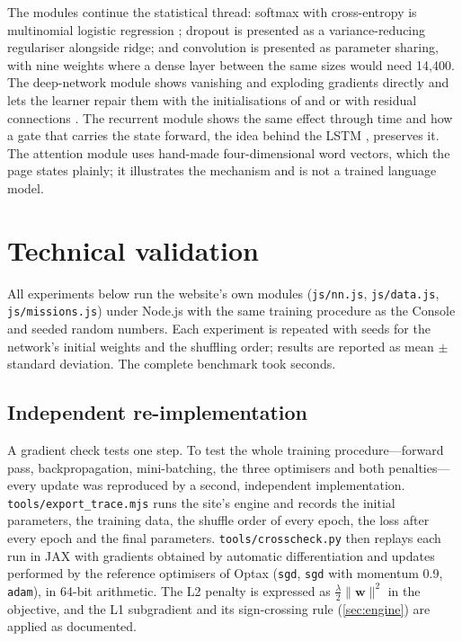 \documentclass[11pt,a4paper]{article}
\newcommand{\code}[1]{\texttt{\small #1}}
\begin{document}
The modules continue the statistical thread: softmax with cross-entropy is multinomial logistic regression \citep[chap.~4]{hastie2009esl}; dropout \citep{srivastava2014dropout} is presented as a variance-reducing regulariser alongside ridge; and convolution \citep{lecun1998gradient} is presented as parameter sharing, with nine weights where a dense layer between the same sizes would need 14{,}400. The deep-network module shows vanishing and exploding gradients directly and lets the learner repair them with the initialisations of \citet{glorot2010understanding} and \citet{he2015delving} or with residual connections \citep{he2016deep}. The recurrent module shows the same effect through time and how a gate that carries the state forward, the idea behind the LSTM \citep{hochreiter1997long}, preserves it. The attention module \citep{vaswani2017attention} uses hand-made four-dimensional word vectors, which the page states plainly; it illustrates the mechanism and is not a trained language model.

\section{Technical validation}\label{sec:validation}

All experiments below run the website's own modules (\code{js/nn.js}, \code{js/data.js}, \code{js/missions.js}) under Node.js with the same training procedure as the Console and seeded random numbers. Each experiment is repeated with \nSeeds{} seeds for the network's initial weights and the shuffling order; results are reported as mean $\pm$ standard deviation. The complete benchmark took \runtime{} seconds.

\subsection{Independent re-implementation}\label{sec:xcheck}
A gradient check tests one step. To test the whole training procedure---forward pass, backpropagation, mini-batching, the three optimisers and both penalties---every update was reproduced by a second, independent implementation. \code{tools/export\_trace.mjs} runs the site's engine and records the initial parameters, the training data, the shuffle order of every epoch, the loss after every epoch and the final parameters. \code{tools/crosscheck.py} then replays each run in JAX \xcJax{} \citep{jax2018github} with gradients obtained by automatic differentiation and updates performed by the reference optimisers of Optax \xcOptax{} \citep{deepmind2020jax} (\code{sgd}, \code{sgd} with momentum 0.9, \code{adam}), in 64-bit arithmetic. The L2 penalty is expressed as $\tfrac{\lambda}{2}\lVert\mathbf{w}\rVert^2$ in the objective, and the L1 subgradient and its sign-crossing rule (\cref{sec:engine}) are applied as documented.
\end{document}
